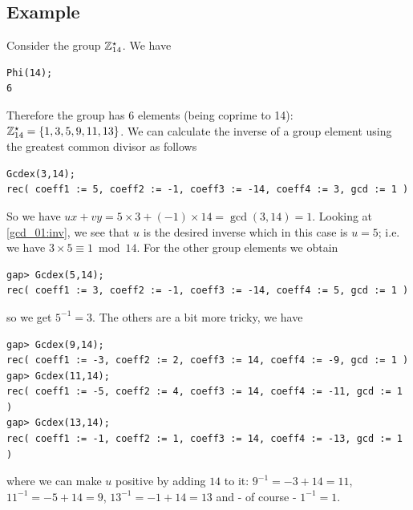 \subsection{Example}

Consider the group $\mathbb{Z}^\star_{14}$. We have

\begin{verbatim}
Phi(14);
6
\end{verbatim}
%
Therefore the group has $6$ elements (being coprime to 14): $\mathbb{Z}^\star_{14} = \{1, 3, 5, 9, 11, 13\}$. We can calculate the inverse of a group element using the greatest common divisor as follows

\begin{verbatim}
Gcdex(3,14);
rec( coeff1 := 5, coeff2 := -1, coeff3 := -14, coeff4 := 3, gcd := 1 )
\end{verbatim}
%
So we have $ux + vy = 5 \times 3 + (-1) \times 14 = \gcd(3,14) = 1$. Looking at \eqref{gcd_01:inv}, we see that $u$ is the desired inverse which in this case is $u=5$; i.e. we have $3 \times 5 \equiv 1 \bmod 14$. For the other group elements we obtain

\begin{verbatim}
gap> Gcdex(5,14);
rec( coeff1 := 3, coeff2 := -1, coeff3 := -14, coeff4 := 5, gcd := 1 )
\end{verbatim}
%
so we get $5^{-1} = 3$. The others are a bit more tricky, we have

\begin{verbatim}
gap> Gcdex(9,14);
rec( coeff1 := -3, coeff2 := 2, coeff3 := 14, coeff4 := -9, gcd := 1 )
gap> Gcdex(11,14);
rec( coeff1 := -5, coeff2 := 4, coeff3 := 14, coeff4 := -11, gcd := 1 )
gap> Gcdex(13,14);
rec( coeff1 := -1, coeff2 := 1, coeff3 := 14, coeff4 := -13, gcd := 1 )
\end{verbatim}
%
where we can make $u$ positive by adding $14$ to it: $9^{-1} = -3 + 14 = 11$, $11^{-1} = -5 + 14 = 9$, $13^{-1} = -1 + 14 = 13$ and - of course - $1^{-1} = 1$.
